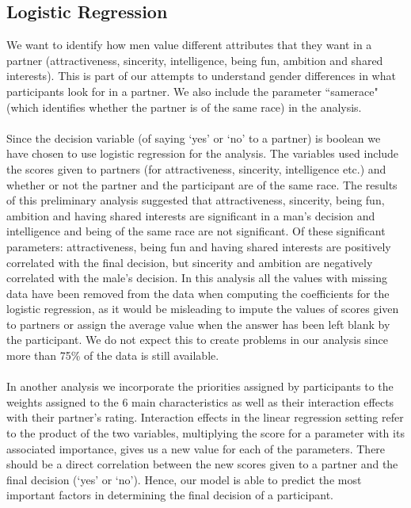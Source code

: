 \documentclass{article}
\begin{document}
\subsection{Logistic Regression}
\label{sec:logistic}
We want to identify how men value different attributes that they want in a partner (attractiveness, sincerity, intelligence, being fun, ambition and shared interests). This is part of our attempts to understand gender differences in what participants look for in a partner. We also include the parameter ``samerace" (which identifies whether the partner is of the same race) in the analysis.\\
\null\\
Since the decision variable (of saying `yes' or `no' to a partner) is boolean we have chosen to use logistic regression for the analysis. The variables used include the scores given to partners (for attractiveness, sincerity, intelligence etc.) and whether or not the partner and the participant are of the same race. The results of this preliminary analysis suggested that attractiveness, sincerity, being fun, ambition and having shared interests are significant in a man's decision and intelligence and being of the same race are not significant. Of these significant parameters: attractiveness, being fun and having shared interests are positively correlated with the final decision, but sincerity and ambition are negatively correlated with the male's decision. In this analysis all the values with missing data have been removed from the data when computing the coefficients for the logistic regression, as it would be misleading to impute the values of scores given to partners or assign the average value when the answer has been left blank by the participant. We do not expect this to create problems in our analysis since more than 75\% of the data is still available. \\
\null\\
In another analysis we incorporate the priorities assigned by participants to the weights assigned to the 6 main characteristics as well as their interaction effects with their partner's rating.  Interaction effects in the linear regression setting refer to the product of the two variables, multiplying the score for a parameter with its associated importance, gives us a new value for each of the parameters. There should be a direct correlation between the new scores given to a partner and the final decision (`yes' or `no').  Hence, our model is able to predict the most important factors in determining the final decision of a participant. 
\end{document}
